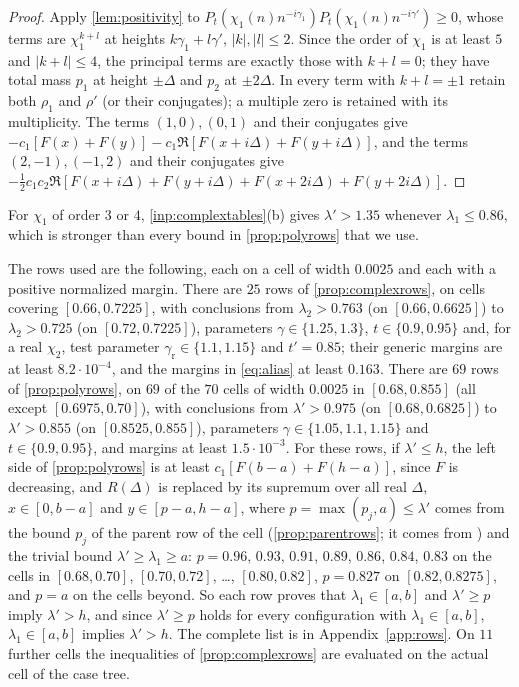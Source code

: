 \begin{proof}
Apply \cref{lem:positivity} to $P_t(\chi_1(n)n^{-i\gamma_1})P_t(\chi_1(n)n^{-i\gamma'})\ge0$, whose terms are
$\chi_1^{k+l}$ at heights $k\gamma_1+l\gamma'$, $|k|,|l|\le2$. Since the order of $\chi_1$ is at least $5$ and
$|k+l|\le4$, the principal terms are exactly those with $k+l=0$; they have total mass $p_1$ at height
$\pm\Delta$ and $p_2$ at $\pm2\Delta$. In every term with $k+l=\pm1$ retain both $\rho_1$ and $\rho'$ (or their
conjugates); a multiple zero is retained with its multiplicity. The terms $(1,0),(0,1)$ and their
conjugates give $-c_1[F(x)+F(y)]-c_1\Re[F(x+i\Delta)+F(y+i\Delta)]$, and the terms $(2,-1),(-1,2)$ and their
conjugates give $-\frac12c_1c_2\Re[F(x+i\Delta)+F(y+i\Delta)+F(x+2i\Delta)+F(y+2i\Delta)]$.
\end{proof}

For $\chi_1$ of order $3$ or $4$, \cref{inp:complextables}(b) gives $\lambda'>1.35$ whenever
$\lambda_1\le0.86$, which is stronger than every bound in \cref{prop:polyrows} that we use.

The rows used are the following, each on a cell of width $0.0025$ and each with a positive
normalized margin. There are $25$ rows of \cref{prop:complexrows}, on cells covering
$[0.66,0.7225]$, with conclusions from $\lambda_2>0.763$ (on $[0.66,0.6625]$) to $\lambda_2>0.725$ (on
$[0.72,0.7225]$), parameters $\gamma\in\{1.25,1.3\}$, $t\in\{0.9,0.95\}$ and, for a real $\chi_2$,
test parameter $\gamma_{\mathrm r}\in\{1.1,1.15\}$ and $t'=0.85$; their generic margins are at least $8.2\cdot10^{-4}$, and the margins
in \eqref{eq:alias} at least $0.163$. There are $69$ rows of \cref{prop:polyrows}, on $69$ of the $70$ cells of width $0.0025$ in
$[0.68,0.855]$ (all except $[0.6975,0.70]$), with conclusions from $\lambda'>0.975$ (on $[0.68,0.6825]$) to $\lambda'>0.855$ (on
$[0.8525,0.855]$), parameters $\gamma\in\{1.05,1.1,1.15\}$ and $t\in\{0.9,0.95\}$, and margins at least
$1.5\cdot10^{-3}$. For these rows, if $\lambda'\le h$, the left side of \cref{prop:polyrows} is at least
$c_1[F(b-a)+F(h-a)]$, since $F$ is decreasing, and $R(\Delta)$ is replaced by its supremum over all real
$\Delta$, $x\in[0,b-a]$ and $y\in[p-a,h-a]$, where $p=\max(p_j,a)\le\lambda'$ comes from the bound $p_j$ of the
parent row of the cell (\cref{prop:parentrows}; it comes from \cite[Table~$2'$]{Xylouris2011nullstellen}) and the
trivial bound $\lambda'\ge\lambda_1\ge a$: $p=0.96$, $0.93$, $0.91$, $0.89$, $0.86$, $0.84$, $0.83$ on the cells in $[0.68,0.70]$,
$[0.70,0.72]$, \dots, $[0.80,0.82]$, $p=0.827$ on $[0.82,0.8275]$, and $p=a$ on the cells beyond. So each row proves
that $\lambda_1\in[a,b]$ and $\lambda'\ge p$ imply $\lambda'>h$, and since $\lambda'\ge p$ holds for every configuration
with $\lambda_1\in[a,b]$, $\lambda_1\in[a,b]$ implies $\lambda'>h$. The complete list is in Appendix~\ref{app:rows}. On $11$ further cells the inequalities of
\cref{prop:complexrows} are evaluated on the actual cell of the case tree.


